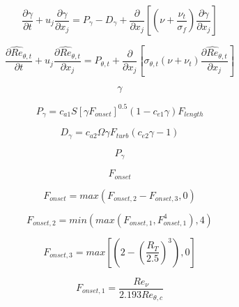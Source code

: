 

\begin{equation}
\frac{\partial \gamma}{\partial t} + u_j \frac{\partial \gamma}{\partial x_j} = P_\gamma  - D_\gamma  + \frac{\partial}{\partial x_j}\left[
 \left( \nu + \frac{\nu_t}{\sigma_f}\right) \frac{\partial \gamma}{\partial x_j} \right]
\end{equation}

\begin{equation}
\frac{\partial \widehat{Re}_{\theta,t}}{\partial t} + u_j \frac{\partial \widehat{Re}_{\theta,t} }{\partial x_j} = P_{\theta,t}  + \frac{\partial}{\partial x_j} \left[
 \sigma_{\theta,t} \left( \nu + \nu_t \right) \frac{\partial \widehat{Re}_{\theta,t}}{\partial x_j} \right]
\end{equation}

\begin{equation}
\gamma
\end{equation}

\begin{equation}
P_\gamma = c_{a1} S \left[ \gamma  F_{onset} \right]^{0.5}  \left(1 - c_{e1} \gamma \right) F_{length}
\end{equation}

\begin{equation}
D_\gamma = c_{a2} \Omega \gamma F_{turb} \left(c_{e2} \gamma -1\right)
\end{equation}

\begin{equation}
P_\gamma
\end{equation}

\begin{equation}
F_{onset}
\end{equation}

\begin{equation}
F_{onset} =  max \left( F_{onset,2} - F_{onset,3}, 0  \right)
\end{equation}

\begin{equation}
F_{onset,2} =  min \left( max \left( F_{onset,1} , F_{onset,1}^4  \right)  , 4\right)
\end{equation}

\begin{equation}
F_{onset,3} =  max \left[\left( 2 - \left( \frac{R_T}{2.5}  \right)^3 \right), 0 \right]
\end{equation}

\begin{equation}
F_{onset,1} = \frac{Re_\nu}{2.193 Re_{\theta,c}}
\end{equation}

